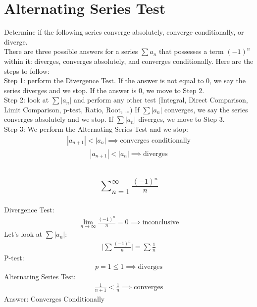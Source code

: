 \documentclass{article}
\begin{document}
\section{Alternating Series Test}
Determine if the following series converge absolutely, converge conditionally, or diverge. \\[10pt]
There are three possible answers for a series $\sum a_n$ that possesses a term $(-1)^n$ within it: diverges, converges absolutely, and converges conditionally. Here are the steps to follow: \\[10pt]
Step 1: perform the Divergence Test. If the answer is not equal to 0, we say the series diverges and we stop. If the answer is 0, we move to Step 2. \\[10pt]
Step 2: look at $\sum |a_n|$ and perform any other test (Integral, Direct Comparison, Limit Comparison, p-test, Ratio, Root, \dots) If $\sum |a_n|$ converges, we say the series converges absolutely and we stop. If $\sum |a_n|$ diverges, we move to Step 3. \\[10pt]
Step 3: We perform the Alternating Series Test and we stop:
\begin{align*}
	|a_{n + 1}| < |a_n| \implies \text{converges conditionally}
\end{align*}
\begin{align*}
	|a_{n + 1}| < |a_n| \implies \text{diverges}
\end{align*}
\subsection{
	\begin{align*}
		\sum_{n = 1}^\infty \frac{(-1)^n}{n}
	\end{align*}
}
Divergence Test:
\begin{align*}
	\lim_{n \to \infty} \frac{(-1)^n}{n} = 0 \implies \text{inconclusive}
\end{align*}
Let's look at $\sum |a_n|$:
\begin{align*}
	\bigg| \sum \frac{(-1)^n}{n} \bigg| = \sum \frac{1}{n}
\end{align*}
P-test:
\begin{align*}
	p = 1 \leq 1 \implies \text{diverges}
\end{align*}
Alternating Series Test:
\begin{align*}
	\frac{1}{n + 1} < \frac{1}{n} \implies \text{converges}
\end{align*}
Answer: Converges Conditionally

\end{document}
